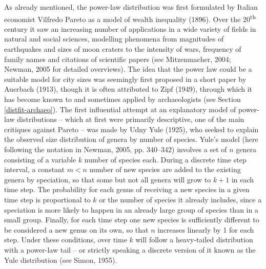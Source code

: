 \documentclass[
  12pt,
]{book}
\begin{document}
As already mentioned, the power-law distribution was first formulated by Italian economist Vilfredo Pareto as a model of wealth inequality (1896). Over the 20\textsuperscript{th} century it saw an increasing number of applications in a wide variety of fields in natural and social sciences, modelling phenomena from magnitudes of earthquakes and sizes of moon craters to the intensity of wars, frequency of family names and citations of scientific papers (see Mitzenmacher, 2004; Newman, 2005 for detailed overviews). The idea that the power law could be a suitable model for city sizes was seemingly first proposed in a short paper by Auerbach (1913), though it is often attributed to Zipf (1949), through which it has become known to and sometimes applied by archaeologists (see Section \ref{distfit-archaeo}). The first influential attempt at an explanatory model of power-law distributions -- which at first were primarily descriptive, one of the main critiques against Pareto -- was made by Udny Yule (1925), who seeked to explain the observed size distribution of genera by number of species. Yule's model (here following the notation in Newman, 2005, pp. 340--342) involves a set of \(n\) genera consisting of a variable \(k\) number of species each. During a discrete time step interval, a constant \(m < n\) number of new species are added to the existing genera by speciation, so that some but not all genera will grow to \(k+1\) in each time step. The probability for each genus of receiving a new species in a given time step is proportional to \(k\) or the number of species it already includes, since a speciation is more likely to happen in an already large group of species than in a small group. Finally, for each time step one new species is sufficiently different to be considered a new genus on its own, so that \(n\) increases linearly by 1 for each step. Under these conditions, over time \(k\) will follow a heavy-tailed distribution with a power-law tail -- or strictly speaking a discrete version of it known as the Yule distribution (see Simon, 1955).
\end{document}
